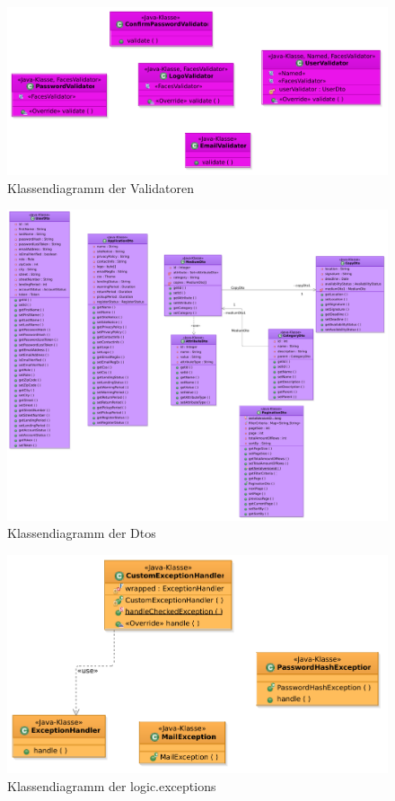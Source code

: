 \documentclass{article}
\begin{document}
\begin{figure}[H]
\hypertarget{Validator}{}
		\centering
		\includegraphics[width = 52em]{KlassendiagrammValidators}
		\caption{Klassendiagramm der Validatoren}
	\end{figure}


\begin{figure}[H]
		\centering
		\includegraphics[angle=270, width = 52em]{Klassendiagramm-Dtoss_1}
		\caption{Klassendiagramm der Dtos}
	\end{figure}

\begin{figure}[H]
		\centering
		\includegraphics[width = 52em]{Klassendiagramm-ExceptionsObere}
		\caption{Klassendiagramm der logic.exceptions}
	\end{figure}
\end{document}
